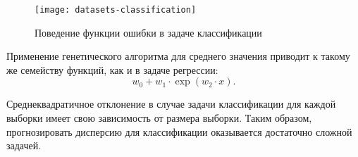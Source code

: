 \begin{figure}[h!]
    \centering
    \texttt{[image: datasets-classification]}
    \caption{Поведение функции ошибки в задаче классификации}
    \label{datasets-classification}
\end{figure}

Применение генетического алгоритма для среднего значения приводит к такому же семейству функций, как и в задаче регрессии:
\[ w_0 + w_1 \cdot \exp(w_2 \cdot x). \]

Среднеквадратичное отклонение в случае задачи классификации для каждой выборки имеет свою зависимость от размера выборки. Таким образом, прогнозировать дисперсию для классификации оказывается достаточно сложной задачей.

